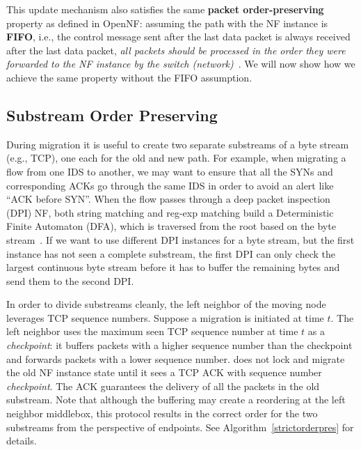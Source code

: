 This update mechanism also satisfies the same \textbf{packet order-preserving} property as defined in OpenNF: assuming the path with the NF instance is \textbf{FIFO}, i.e., the control message sent after the last data packet is always received after the last data packet, \textit{all packets should be processed in the order they were forwarded to the NF instance by the switch (network)}~\cite{OpenNF}. We will now show how we achieve the same property without the FIFO assumption.
 
\subsection{Substream Order Preserving}  

During migration it is useful to create two separate substreams of a byte stream (e.g., TCP), one each for the old and new path. For example, when migrating a flow from one IDS to another, we may want to ensure that all the SYNs and corresponding ACKs go through the same IDS in order to avoid an alert like ``ACK before SYN''. When the flow passes through a deep packet inspection (DPI) NF, both string matching and reg-exp matching build a Deterministic Finite Automaton (DFA), which is traversed from the root based on the byte stream~\cite{aho, yaron}. If we want to use different DPI instances for a byte stream, but the first instance has not seen a complete substream, the first DPI can only check the largest continuous byte stream before it has to buffer the remaining bytes and send them to the second DPI. 


In order to divide substreams cleanly, the left neighbor of the moving node leverages TCP sequence numbers. Suppose a migration is initiated at time $t$. The left neighbor uses the maximum seen TCP sequence number at time $t$ as a \textit{checkpoint}: it buffers packets with a higher sequence number than the checkpoint and forwards packets with a lower sequence number. \system does not lock and migrate the old NF instance state until it sees a TCP ACK with sequence number \textit{checkpoint}. The ACK guarantees the delivery of all the packets in the old substream. Note that although the buffering may create a reordering at the left neighbor middlebox, this protocol results in the correct order for the two substreams from the perspective of endpoints. See Algorithm~\ref{strictorderpres} for details. 



